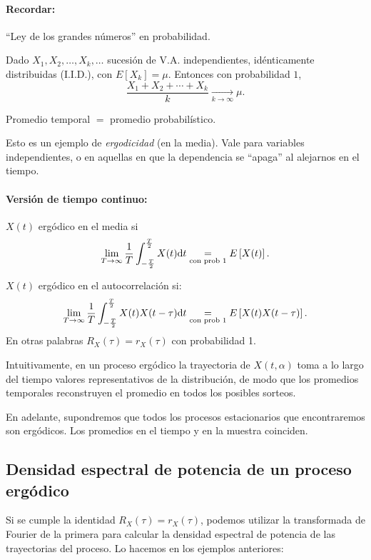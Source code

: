 \paragraph{Recordar:} ``Ley de los grandes números'' en probabilidad.

Dado $X_1,X_2,\ldots,X_k,\ldots$ sucesión de V.A. independientes,
idénticamente distribuidas (I.I.D.), con $E[X_k]=\mu$. Entonces
con probabilidad $1$,
\[\frac{X_1+X_2+\cdots+X_k}{k}\xrightarrow[k\rightarrow\infty]{}\mu.\]

Promedio temporal $=$ promedio probabilístico.

Esto es un ejemplo de \emph{ergodicidad} (en la media). Vale para
variables independientes, o en aquellas en que la dependencia se
``apaga'' al alejarnos en el tiempo.

\paragraph{Versión de tiempo continuo:} $X(t)$  ergódico en el media si
\[\lim_{T\rightarrow\infty}\frac{1}{T}\int^{\frac{T}{2}}_{-\frac{T}{2}}X(t)\mathrm{d} t \underset{\text{con prob $1$}}{=}E\left[X(t)\right].\]

$X(t)$ ergódico en el autocorrelación si:
\[\lim_{T\rightarrow\infty}\frac{1}{T}\int^{\frac{T}{2}}_{-\frac{T}{2}}X(t)X(t-\tau)\mathrm{d} t \underset{\text{con prob $1$}}{=}E\left[X(t)X(t-\tau)\right].\]
En otras palabras $R_X(\tau)=r_X(\tau)$ con probabilidad 1.

Intuitivamente, en un proceso ergódico la trayectoria de
$X(t,\alpha)$ toma a lo largo del tiempo valores representativos
de la distribución, de modo que los promedios temporales
reconstruyen el promedio en todos los posibles sorteos.

En adelante, supondremos que todos los procesos estacionarios que
encontraremos son ergódicos. Los promedios en el tiempo y en la
muestra coinciden.

\subsection*{Densidad espectral de potencia de un proceso ergódico}

Si se cumple la identidad $R_X(\tau)=r_X(\tau)$, podemos utilizar
la transformada de Fourier de la primera para calcular la densidad
espectral de potencia de las trayectorias del proceso. Lo hacemos
en los ejemplos anteriores:


